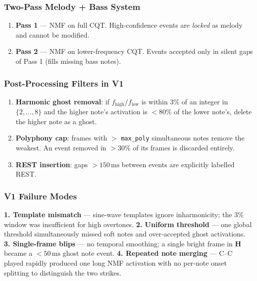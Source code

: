 \documentclass[12pt, a4paper]{article}
\begin{document}
\subsubsection{Two-Pass Melody + Bass System}

\begin{enumerate}[leftmargin=2em]
  \item \textbf{Pass 1} --- NMF on full CQT. High-confidence events are
        \emph{locked} as melody and cannot be modified.
  \item \textbf{Pass 2} --- NMF on lower-frequency CQT. Events accepted
        only in silent gaps of Pass 1 (fills missing bass notes).
\end{enumerate}

\subsubsection{Post-Processing Filters in V1}

\begin{enumerate}[leftmargin=2em]
  \item \textbf{Harmonic ghost removal}: if
        $f_{\text{high}}/f_{\text{low}}$ is within 3\% of an integer in
        $\{2,\ldots,8\}$ and the higher note's activation is $< 80\%$ of the
        lower note's, delete the higher note as a ghost.
  \item \textbf{Polyphony cap}: frames with $>$ \texttt{max\_poly}
        simultaneous notes remove the weakest. An event removed in $> 30\%$
        of its frames is discarded entirely.
  \item \textbf{REST insertion}: gaps $> 150\,\text{ms}$ between events are
        explicitly labelled REST.
\end{enumerate}

\subsubsection{V1 Failure Modes}

\begin{warnbox}
  \textbf{1. Template mismatch} --- sine-wave templates ignore inharmonicity;
  the 3\% window was insufficient for high overtones.\newline
  \textbf{2. Uniform threshold} --- one global threshold simultaneously
  missed soft notes and over-accepted ghost activations.\newline
  \textbf{3. Single-frame blips} --- no temporal smoothing; a single bright
  frame in $\mathbf{H}$ became a $< 50\,\text{ms}$ ghost note event.\newline
  \textbf{4. Repeated note merging} --- C--C played rapidly produced one long
  NMF activation with no per-note onset splitting to distinguish the two strikes.
\end{warnbox}
\end{document}
